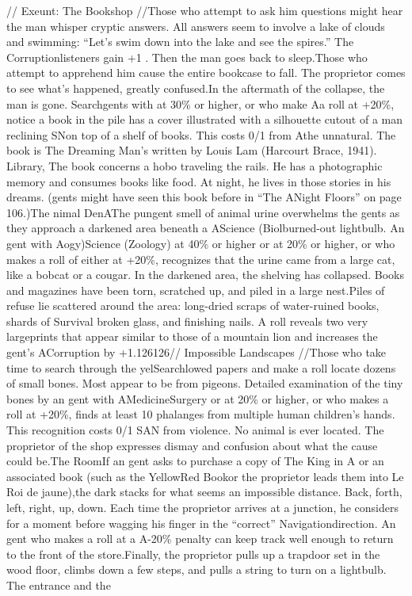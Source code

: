 \documentclass{report}
\begin{document}
\begin{multicols}{2}
// Exeunt: The Bookshop //Those who attempt to ask him questions might hear the man whisper cryptic answers. All answers seem to involve a lake of clouds and swimming: “Let's swim down into the lake and see the spires.” The Corruptionlisteners gain +1 . Then the man goes back to sleep.Those who attempt to apprehend him cause the entire bookcase to fall. The proprietor comes to see what's happened, greatly confused.In the aftermath of the collapse, the man is gone. Searchgents with  at 30\% or higher, or who make Aa roll at +20\%, notice a book in the pile has a cover illustrated with a silhouette cutout of a man reclining SNon top of a shelf of books. This costs 0/1  from Athe unnatural. The book is The Dreaming Man's written by Louis Lam (Harcourt Brace, 1941). Library, The book concerns a hobo traveling the rails. He has a photographic memory and consumes books like food. At night, he lives in those stories in his dreams. (gents might have seen this book before in “The ANight Floors” on page 106.)The nimal DenAThe pungent smell of animal urine overwhelms the gents as they approach a darkened area beneath a AScience (Biolburned-out lightbulb. An gent with Aogy)Science (Zoology) at 40\% or higher or  at 20\% or higher, or who makes a roll of either at +20\%, recognizes that the urine came from a large cat, like a bobcat or a cougar. In the darkened area, the shelving has collapsed. Books and magazines have been torn, scratched up, and piled in a large nest.Piles of refuse lie scattered around the area: long-dried scraps of water-ruined books, shards of Survival broken glass, and finishing nails. A roll reveals two very largeprints that appear similar to  those of a mountain lion and increases the gent's ACorruption by +1.126126// Impossible Landscapes //Those who take time to search through the yelSearchlowed papers and make a  roll locate dozens of small bones. Most appear to be from pigeons. Detailed examination of the tiny bones by an gent with AMedicineSurgery or  at 20\% or higher, or who makes a roll at +20\%, finds at least 10 phalanges from multiple human children's hands. This recognition costs 0/1 SAN from violence. No animal is ever located. The proprietor of the shop expresses dismay and confusion about what the cause could be.The RoomIf an gent asks to purchase a copy of The King in A or an associated book (such as the  YellowRed Bookor  the proprietor leads them into Le Roi de jaune),the dark stacks for what seems an impossible distance. Back, forth, left, right, up, down. Each time the proprietor arrives at a junction, he considers for a moment before wagging his finger in the “correct” Navigationdirection. An gent who makes a  roll at a A-20\% penalty can keep track well enough to return to the front of the store.Finally, the proprietor pulls up a trapdoor set in the wood floor, climbs down a few steps, and pulls a string to turn on a lightbulb. The entrance and the \newpage

\end{multicols}
\end{document}
